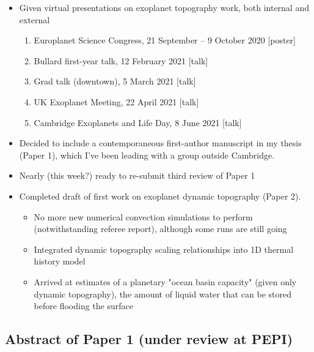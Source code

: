 \documentclass[10pt,a4paper]{article}
\begin{document}
\begin{itemize}

\item Given virtual presentations on exoplanet topography work, both internal and external

\begin{enumerate}
\item Europlanet Science Congress, 21 September -- 9 October 2020 [poster]
\item Bullard first-year talk, 12 February 2021 [talk]
\item Grad talk (downtown), 5 March 2021 [talk]
\item UK Exoplanet Meeting, 22 April 2021 [talk]
\item Cambridge Exoplanets and Life Day, 8 June 2021 [talk]
\end{enumerate}

\item Decided to include a contemporaneous first-author manuscript in my thesis (Paper 1), which I've been leading with a group outside Cambridge.

\item Nearly (this week?) ready to re-submit third review of Paper 1


\item Completed draft of first work on exoplanet dynamic topography (Paper 2).

\begin{itemize}

\item No more new numerical convection simulations to perform (notwithstanding referee report), although some runs are still going

\item Integrated dynamic topography scaling relationships into 1D thermal history model

\item Arrived at estimates of a planetary "ocean basin capacity" (given only dynamic topography), the amount of liquid water that can be stored before flooding the surface

\end{itemize}

\end{itemize}


\subsection{Abstract of Paper 1 (under review at PEPI)}
\end{document}
